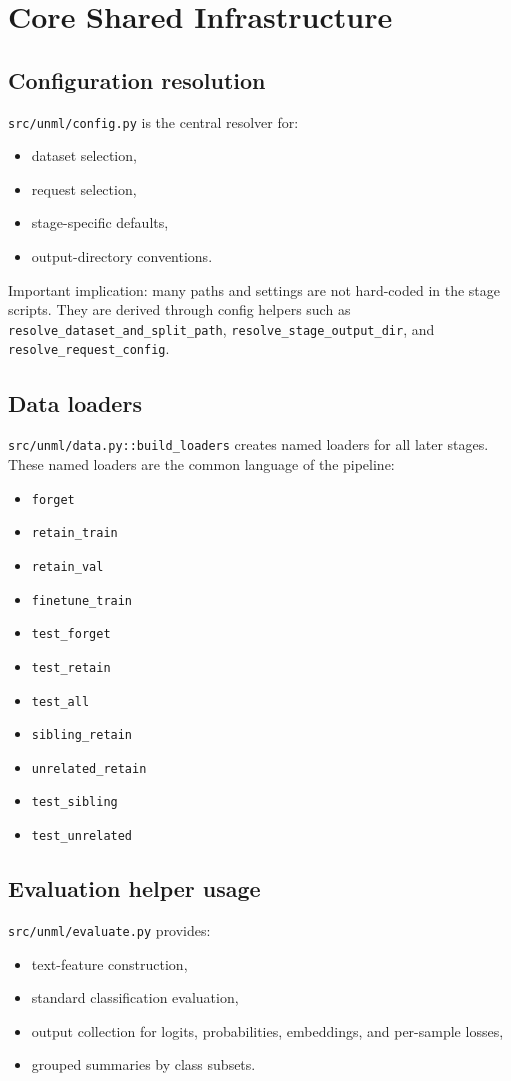 \documentclass[10pt,a4paper]{article}
\begin{document}
\section{Core Shared Infrastructure}
\subsection{Configuration resolution}
\texttt{src/unml/config.py} is the central resolver for:
\begin{itemize}
  \item dataset selection,
  \item request selection,
  \item stage-specific defaults,
  \item output-directory conventions.
\end{itemize}

Important implication: many paths and settings are not hard-coded in the stage scripts. They are derived through config helpers such as \texttt{resolve\_dataset\_and\_split\_path}, \texttt{resolve\_stage\_output\_dir}, and \texttt{resolve\_request\_config}.

\subsection{Data loaders}
\texttt{src/unml/data.py::build\_loaders} creates named loaders for all later stages. These named loaders are the common language of the pipeline:
\begin{itemize}
  \item \texttt{forget}
  \item \texttt{retain\_train}
  \item \texttt{retain\_val}
  \item \texttt{finetune\_train}
  \item \texttt{test\_forget}
  \item \texttt{test\_retain}
  \item \texttt{test\_all}
  \item \texttt{sibling\_retain}
  \item \texttt{unrelated\_retain}
  \item \texttt{test\_sibling}
  \item \texttt{test\_unrelated}
\end{itemize}

\subsection{Evaluation helper usage}
\texttt{src/unml/evaluate.py} provides:
\begin{itemize}
  \item text-feature construction,
  \item standard classification evaluation,
  \item output collection for logits, probabilities, embeddings, and per-sample losses,
  \item grouped summaries by class subsets.
\end{itemize}
\end{document}
